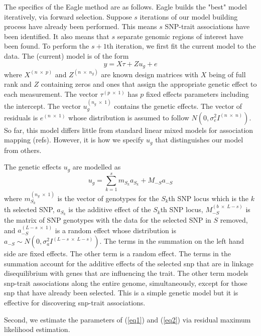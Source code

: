 \documentclass{nature}
\begin{document}
The specifics of the Eagle method are as follows. 
Eagle builds the "best" model iteratively, via forward selection. 
Suppose $s$ iterations of our model building process have already been performed. This means $s$ SNP-trait 
associations have been identified.  It also means that $s$ separate genomic regions of interest have been found.  
To perform the $s+1$th  iteration, we first fit the current model to the data. 
The (current) model is of the form 
\begin{equation}
\label{eq1}
y = X \tau + Z u_g + e
\end{equation}
where 
$X^{(n \; \times \; p)}$ and $Z^{( n \; \times \; n_g)}$ are known design matrices with $X$ being of full rank and $Z$ 
containing zeros and ones that assign the appropriate genetic effect to each measurement. 
The vector 
$\tau^{(p \; \times \; 1)}$ has $p$ fixed effects parameters including the intercept. The vector 
$u_g^{(n_g \; \times \; 1)}$ contains the 
genetic effects. The vector of residuals is 
$e^{(n \; \times \;1)}$ whose distribution is assumed to follow $N(0, \sigma^2_e I^{(n \; \times \; n)})$. 
So far,  this model differs little from standard linear mixed models for association mapping (refs). 
However, 
it is how we specify $u_g$ that distinguishes our model from others. 

The genetic effects $u_g$ are modelled as 
\begin{equation}
\label{eq2}
u_g = \sum_{k=1}^s  m_{S_k} a_{S_k} + M_{-S} a_{-S}
\end{equation}
where $m_{S_k}^{(n_g \; \times \; 1)}$ is the vector of genotypes for the $S_k$th SNP locus which is the $k$th selected SNP, 
$a_{S_k}$ is the additive effect of the $S_k$th SNP locus, $M_{-S}^{(b \; \times \; L-s)}$ is the matrix of  SNP genotypes 
with the data for the selected SNP in $S$ removed,  and $a_{-S}^{(L-s \; \times  \; 1)}$ is a random effect whose distribution is 
$a_{-S} \sim N(0, \sigma_a^2 I^{(L-s \; \times \;  L-s)})$. 
The terms in the summation on the left hand side are fixed effects.  The other term is a random effect.  The terms 
in the summation account 
for the additive effects of the selected snp that are in linkage disequilibrium with genes that are influencing the trait. The other term models 
snp-trait associations along the entire genome, simultaneously, except for those snp that have already been selected. 
This is a simple genetic model but it 
is effective for discovering snp-trait associations. 


Second, we estimate the parameters of (\ref{eq1}) and (\ref{eq2}) via residual maximum likelihood estimation. 
\end{document}

